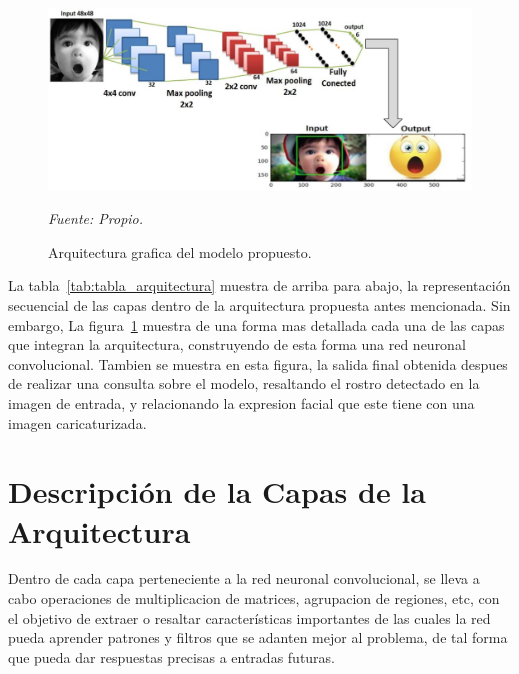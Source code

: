 \begin{figure}[H]
		\centering
		\includegraphics[width=180mm]{./Imagenes/arquitectura_CNN_grafico.pdf}
		\caption{Arquitectura grafica del modelo propuesto.}
		\vspace{0.15cm}
		\textit{Fuente: Propio.}
		\label{fig:arquitectura_CNN_grafico}
\end{figure}

La tabla~\ref{tab:tabla_arquitectura} muestra de arriba para abajo, la representación secuencial de las capas dentro de la arquitectura propuesta antes mencionada. Sin embargo, La figura~\ref{fig:arquitectura_CNN_grafico} muestra de una forma mas detallada cada una de las capas que integran la arquitectura, construyendo de esta forma una red neuronal convolucional. Tambien se muestra en esta figura, la salida final obtenida despues de realizar una consulta sobre el modelo, resaltando el rostro detectado en la imagen de entrada, y relacionando la expresion facial que este tiene con una imagen caricaturizada.

\section{Descripción de la Capas de la Arquitectura}

Dentro de cada capa perteneciente a la red neuronal convolucional, se lleva a cabo operaciones de multiplicacion de matrices, agrupacion de regiones, etc, con el objetivo de extraer o resaltar características importantes de las cuales la red pueda aprender patrones y filtros que se adanten mejor al problema, de tal forma que pueda dar respuestas precisas a entradas futuras. 

